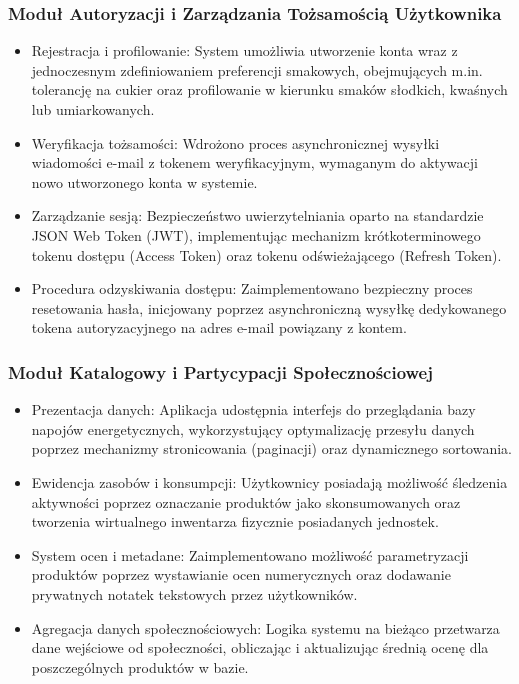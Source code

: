 \documentclass[12pt,a4paper]{article}
\begin{document}
\subsubsection{Moduł Autoryzacji i Zarządzania Tożsamością Użytkownika}
\begin{itemize}
    \item Rejestracja i profilowanie: System umożliwia utworzenie konta wraz z jednoczesnym zdefiniowaniem preferencji smakowych, obejmujących m.in. tolerancję na cukier oraz profilowanie w kierunku smaków słodkich, kwaśnych lub umiarkowanych.
    \item Weryfikacja tożsamości: Wdrożono proces asynchronicznej wysyłki wiadomości e-mail z tokenem weryfikacyjnym, wymaganym do aktywacji nowo utworzonego konta w systemie.
    \item Zarządzanie sesją: Bezpieczeństwo uwierzytelniania oparto na standardzie JSON Web Token (JWT), implementując mechanizm krótkoterminowego tokenu dostępu (Access Token) oraz tokenu odświeżającego (Refresh Token).
    \item Procedura odzyskiwania dostępu: Zaimplementowano bezpieczny proces resetowania hasła, inicjowany poprzez asynchroniczną wysyłkę dedykowanego tokena autoryzacyjnego na adres e-mail powiązany z kontem.
\end{itemize}

\subsubsection{Moduł Katalogowy i Partycypacji Społecznościowej}
\begin{itemize}
    \item Prezentacja danych: Aplikacja udostępnia interfejs do przeglądania bazy napojów energetycznych, wykorzystujący optymalizację przesyłu danych poprzez mechanizmy stronicowania (paginacji) oraz dynamicznego sortowania.
    \item Ewidencja zasobów i konsumpcji: Użytkownicy posiadają możliwość śledzenia aktywności poprzez oznaczanie produktów jako skonsumowanych oraz tworzenia wirtualnego inwentarza fizycznie posiadanych jednostek.
    \item System ocen i metadane: Zaimplementowano możliwość parametryzacji produktów poprzez wystawianie ocen numerycznych oraz dodawanie prywatnych notatek tekstowych przez użytkowników.
    \item Agregacja danych społecznościowych: Logika systemu na bieżąco przetwarza dane wejściowe od społeczności, obliczając i aktualizując średnią ocenę dla poszczególnych produktów w bazie.
\end{itemize}
\end{document}
